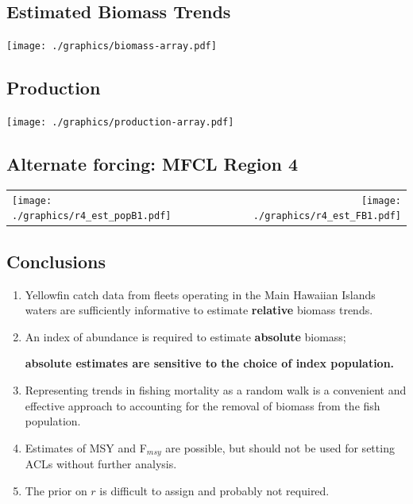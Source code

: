\documentclass[letterpaper,KOMA,landscape,titlepage]{powersem}
\begin{document}
\begin{slide}\section{Estimated Biomass Trends}
\label{fig:estbiomass}
\begin{center}
\texttt{[image: ./graphics/biomass-array.pdf]}
\end{center}
\end{slide}

\begin{slide}\section{Production}
\label{fig:estprod}
\begin{center}
\texttt{[image: ./graphics/production-array.pdf]}
\end{center}
\end{slide}


\begin{slide}\section{Alternate forcing: MFCL Region 4}
\label{fig:estr4}
\begin{center}
\begin{tabular}{lr}
\texttt{[image: ./graphics/r4\_est\_popB1.pdf]}&
\texttt{[image: ./graphics/r4\_est\_FB1.pdf]}\\
\end{tabular}
\end{center}
\end{slide}

\begin{slide}\section{Conclusions}
\begin{enumerate}
\item Yellowfin catch data from fleets operating in the Main Hawaiian
Islands waters are sufficiently informative to estimate 
{\bfseries relative} biomass trends.
\item An index of abundance is required to estimate 
{\bfseries absolute} biomass;\par
{\bfseries absolute estimates are sensitive to the choice of index
population.}
\item Representing trends in fishing mortality as a random walk is a
convenient and effective approach to accounting for the removal of
biomass from the fish population.
\item Estimates of MSY and F$_{msy}$ are possible, but should not be
used for setting ACLs without further analysis.
\item The prior on $r$ is difficult to assign and probably not required.
\end{enumerate}
\end{slide}
\end{document}
